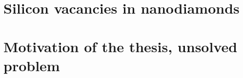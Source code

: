 \section[Silicon vacancies in nanodiamonds]{Silicon vacancies in nanodiamonds}

\section[Motivation of the thesis, unsolved problem]{Motivation of the thesis, unsolved problem}
